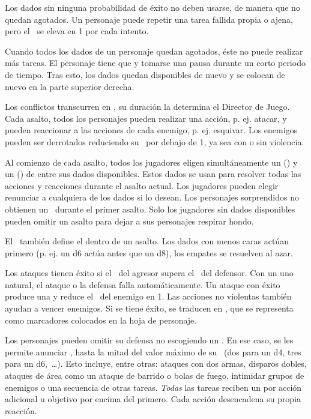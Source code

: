 {		Los dados sin ninguna probabilidad de éxito no deben usarse, de manera que no quedan agotados. Un personaje puede repetir una tarea fallida propia o ajena, pero el \TN~se eleva en 1 por cada intento.

		Cuando todos los dados de un personaje quedan agotados, éste no puede realizar más tareas. El personaje tiene que  y tomarse una pausa durante un corto periodo de tiempo. Tras esto, los dados quedan disponibles de nuevo y se colocan de nuevo en la parte superior derecha.


		\noindent
		Los conflictos transcurren en , su duración la determina el Director de Juego. Cada asalto, todos los personajes pueden realizar una acción, p. ej. atacar, y pueden reaccionar a las acciones de cada enemigo, p. ej. esquivar. Los enemigos pueden ser derrotados reduciendo su \HD\ por debajo de 1, ya sea con o sin violencia.

		Al comienzo de cada asalto, todos los jugadores eligen simultáneamente un  (\AD) y un  (\RD) de entre sus dados disponibles. Estos dados se usan para resolver todas las acciones y reacciones durante el asalto actual. Los jugadores pueden elegir renunciar a cualquiera de los dados si lo desean. Los personajes sorprendidos no obtienen un \AD\ durante el primer asalto. Solo los jugadores sin dados disponibles pueden omitir un asalto para dejar a sus personajes respirar hondo.

		El \AD\ también define el  dentro de un asalto. Los dados con menos caras actúan primero (p. ej. un d6 actúa antes que un d8), los empates se resuelven al azar.

		Los ataques tienen éxito si el \AD\ del agresor supera el \RD\ del defensor. Con un uno natural, el ataque o la defensa falla automáticamente. Un ataque con éxito produce una  y reduce el \HD\ del enemigo en 1. Las acciones no violentas también ayudan a vencer enemigos. Si se tiene éxito, se traducen en , que se representa como marcadores colocados en la hoja de personaje.

		Los personajes pueden omitir su defensa no escogiendo un \RD. En ese caso, se les permite anunciar , hasta la mitad del valor máximo de su \AD~(dos para un d4, tres para un d6,~\ldots). Esto incluye, entre otras: ataques con dos armas, disparos dobles, ataques de área como un ataque de barrido o bolas de fuego, intimidar grupos de enemigos o una secuencia de otras tareas. \emph{Todas} las tareas reciben un  por acción adicional u objetivo por encima del primero. Cada acción desencadena su propia reacción.

}
